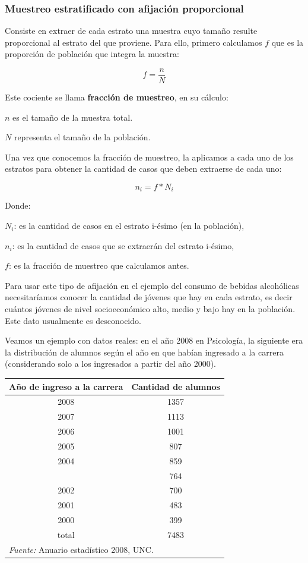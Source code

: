 \documentclass[]{book}
\begin{document}
\hypertarget{muestreo-estratificado-con-afijacion-proporcional}{%
\subsubsection{Muestreo estratificado con afijación proporcional}\label{muestreo-estratificado-con-afijacion-proporcional}}

Consiste en extraer de cada estrato una muestra cuyo tamaño resulte
proporcional al estrato del que proviene. Para ello, primero calculamos \(f\)
que es la proporción de población que integra la muestra:

\[f = \frac{n}{N}\]

Este cociente se llama \textbf{fracción de muestreo}, en su cálculo:

\(n\) es el tamaño de la muestra total.

\(N\) representa el tamaño de la población.

Una vez que conocemos la fracción de muestreo, la aplicamos a cada uno
de los estratos para obtener la cantidad de casos que deben extraerse de
cada uno:

\[n_{i} = f*N_{i}\]

Donde:

\(N_{i}\): es la cantidad de casos en el estrato i-ésimo (en la población),

\(n_{i}\): es la cantidad de casos que se extraerán del estrato i-ésimo,

\(f\): es la fracción de muestreo que calculamos antes.

Para usar este tipo de afijación en el ejemplo del consumo de bebidas
alcohólicas necesitaríamos conocer la cantidad de jóvenes que hay en
cada estrato, es decir cuántos jóvenes de nivel socioeconómico alto,
medio y bajo hay en la población. Este dato usualmente es desconocido.

Veamos un ejemplo con datos reales: en el año 2008 en Psicología, la
siguiente era la distribución de alumnos según el año en que habían
ingresado a la carrera (considerando solo a los ingresados a partir del
año 2000).

\begin{table}[H]
\centering
\begin{tabular}{cc}
\toprule
Año de ingreso a la carrera & Cantidad de alumnos\\
\midrule
\rowcolor{gray!6}  2008 & 1357\\
2007 & 1113\\
\rowcolor{gray!6}  2006 & 1001\\
2005 & 807\\
\rowcolor{gray!6}  2004 & 859\\
\addlinespace
2003 & 764\\
\rowcolor{gray!6}  2002 & 700\\
2001 & 483\\
\rowcolor{gray!6}  2000 & 399\\
total & 7483\\
\bottomrule
\multicolumn{2}{l}{\textit{Fuente: } Anuario estadístico 2008, UNC.}\\
\end{tabular}
\end{table}
\end{document}
